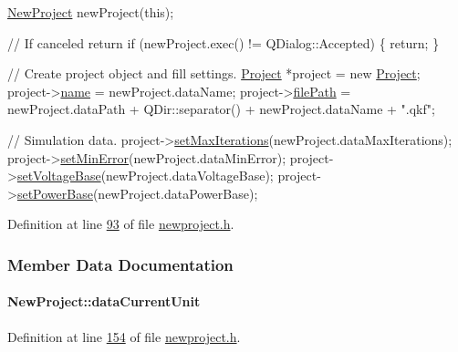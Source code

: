 \begin{DoxyCode}
\hyperlink{class_new_project}{NewProject} newProject(\textcolor{keyword}{this});

\textcolor{comment}{// If canceled return}
\textcolor{keywordflow}{if} (newProject.exec() != QDialog::Accepted) \{
  \textcolor{keywordflow}{return};
\}

\textcolor{comment}{// Create project object and fill settings.}
\hyperlink{class_project}{Project} *project = \textcolor{keyword}{new} \hyperlink{class_project}{Project};
project->\hyperlink{class_project_a82dd2d1bc38f9fd08c9a811fcaa76b38}{name} = newProject.dataName;
project->\hyperlink{class_project_a79f30adcefd0b72bd4ac7db724bc9531}{filePath} = newProject.dataPath + QDir::separator() +
                    newProject.dataName + \textcolor{stringliteral}{".qkf"};

\textcolor{comment}{// Simulation data.}
project->\hyperlink{class_project_af2046a5d542d3e3dd51cb9cb04604e8f}{setMaxIterations}(newProject.dataMaxIterations);
project->\hyperlink{class_project_a2cb776c39adb42a1113bf7887d0d4636}{setMinError}(newProject.dataMinError);
project->\hyperlink{class_project_a494c3e89851f754188c7abaedbf77ef6}{setVoltageBase}(newProject.dataVoltageBase);
project->\hyperlink{class_project_abb4df805b3cd3af509a41e657eb4bb83}{setPowerBase}(newProject.dataPowerBase);
\end{DoxyCode}
 

Definition at line \hyperlink{newproject_8h_source_l00093}{93} of file \hyperlink{newproject_8h_source}{newproject.\+h}.



\subsubsection{Member Data Documentation}
\hypertarget{class_new_project_a9d389065ff7f8588338069018088a20f}{}
\paragraph[{data\+Current\+Unit}]{ New\+Project\+::data\+Current\+Unit}\label{class_new_project_a9d389065ff7f8588338069018088a20f}


Definition at line \hyperlink{newproject_8h_source_l00154}{154} of file \hyperlink{newproject_8h_source}{newproject.\+h}.


